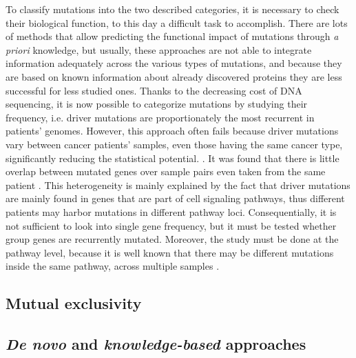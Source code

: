 To classify mutations into the two described categories, it is necessary to check their biological function, to this day a difficult task to accomplish. There are lots of methods that allow predicting the functional impact of mutations through \textit{a priori} knowledge, but usually, these approaches are not able to integrate information adequately across the various types of mutations, and because they are based on known information about already discovered proteins they are less successful for less studied ones. Thanks to the decreasing cost of DNA sequencing, it is now possible to categorize mutations by studying their frequency, i.e. driver mutations are proportionately the most recurrent in patients' genomes. However, this approach often fails because driver mutations vary between cancer patients' samples, even those having the same cancer type, significantly reducing the statistical potential. \cite{multi-dendrix}. It was found that there is little overlap between mutated genes over sample pairs even taken from the same patient \cite{mdpfinder}. This heterogeneity is mainly explained by the fact that driver mutations are mainly found in genes that are part of cell signaling pathways, thus different patients may harbor mutations in different pathway loci. Consequentially, it is not sufficient to look into single gene frequency, but it must be tested whether group genes are recurrently mutated. Moreover, the study must be done at the pathway level, because it is well known that there may be different mutations inside the same pathway, across multiple samples \cite{multi-dendrix}.

\subsection{Mutual exclusivity}

\subsection{\textit{De novo} and \textit{knowledge-based} approaches}

\cleardoublepage

